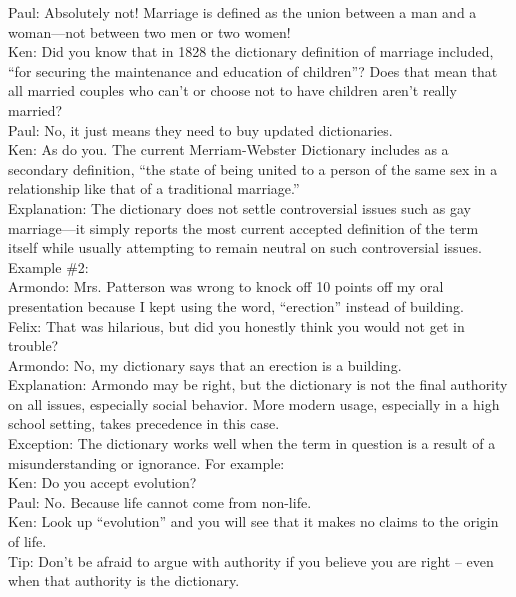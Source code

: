 \documentclass[a4paper,12pt,single,pdftex]{scrartcl}
\begin{document}
{    
      Paul: Absolutely not!  Marriage is defined as the union between a man and a woman—not between two men or two women!
    \\

    
      Ken: Did you know that in 1828 the dictionary definition of marriage included, “for securing the maintenance and education of children”?  Does that mean that all married couples who can’t or choose not to have children aren’t really married?
    \\

    
      Paul: No, it just means they need to buy updated dictionaries.
    \\

    
      Ken: As do you.  The current Merriam-Webster Dictionary includes as a secondary definition, “the state of being united to a person of the same sex in a relationship like that of a traditional marriage.”
    \\

    
      Explanation: The dictionary does not settle controversial issues such as gay marriage—it simply reports the most current accepted definition of the term itself while usually attempting to remain neutral on such controversial issues.
    \\

    
      Example \#2:
    \\

    
      Armondo: Mrs. Patterson was wrong to knock off 10 points off my oral presentation because I kept using the word, “erection” instead of building.
    \\

    
      Felix: That was hilarious, but did you honestly think you would not get in trouble?
    \\

    
      Armondo:  No, my dictionary says that an erection is a building.
    \\

    
      Explanation: Armondo may be right, but the dictionary is not the final authority on all issues, especially social behavior.  More modern usage, especially in a high school setting, takes precedence in this case.
    \\

    
      Exception: The dictionary works well when the term in question is a result of a misunderstanding or ignorance.  For example:
    \\

    
      Ken: Do you accept evolution?
    \\

    
      Paul: No. Because life cannot come from non-life.
    \\

    
      Ken: Look up “evolution” and you will see that it makes no claims to the origin of life.
    \\

    
      Tip: Don’t be afraid to argue with authority if you believe you are right -- even when that authority is the dictionary.
    \\

  }
\end{document}
